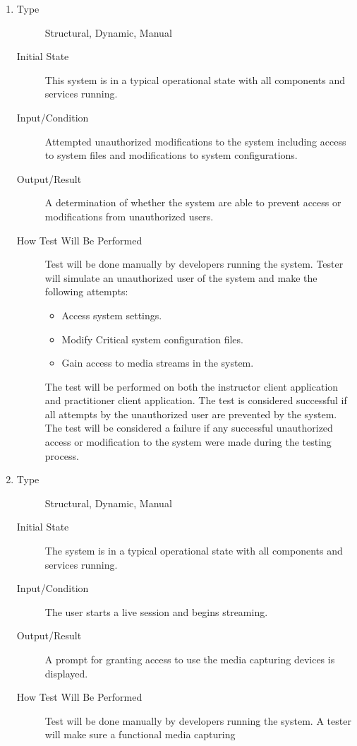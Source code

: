 \documentclass[12pt, titlepage]{article}
\begin{document}
\begin{enumerate}[NFR-T1]
\begin{description}
  \end{description}
\item \label{NFRT23}
  \begin{description}
  \item[Type] Structural, Dynamic, Manual
  \item[Initial State] This system is in a typical operational state with all
    components and services running.
  \item[Input/Condition] Attempted unauthorized modifications to the system
    including access to system files and modifications to system configurations.
  \item[Output/Result] A determination of whether the system are able to prevent
    access or modifications from unauthorized users.
  \item[How Test Will Be Performed] Test will be done manually by developers
    running the system. Tester will simulate an unauthorized user of the system
    and make the following attempts:
    \begin{itemize}
    \item Access system settings.
    \item Modify Critical system configuration files.
    \item Gain access to media streams in the system.
    \end{itemize}
    The test will be performed on both the instructor client application and
    practitioner client application. The test is considered successful if all
    attempts by the unauthorized user are prevented by the system. The test will
    be considered a failure if any successful unauthorized access or
    modification to the system were made during the testing process.
  \end{description}
\item \label{NFRT24}
  \begin{description}
  \item[Type] Structural, Dynamic, Manual
  \item[Initial State] The system is in a typical operational state with all
    components and services running.
  \item[Input/Condition] The user starts a live session and begins streaming.
  \item[Output/Result] A prompt for granting access to use the media capturing
    devices is displayed.
  \item[How Test Will Be Performed] Test will be done manually by developers
    running the system. A tester will make sure a functional media capturing

\end{description}
\end{enumerate}
\end{document}

